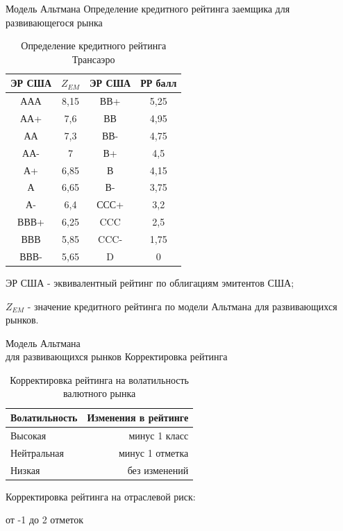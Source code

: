 \documentclass[_Banking_p2.tex]{subfiles}
\begin{document}
\begin{frame}[shrink=20]{Модель Альтмана}
{Определение кредитного рейтинга заемщика для развивающегося рынка}
\begin{table}[htbp]
\caption{Определение кредитного рейтинга Трансаэро}
\centering
\begin{tabular}{cccc}
\toprule
ЭР США & $Z_{EM}$ & ЭР США & РР балл \\
\midrule
ААА   & 8,15  & ВВ+   & 5,25 \\
АА+   & 7,6   & ВВ    & 4,95 \\
АА    & 7,3   & ВВ-   & 4,75 \\
АА-   & 7     & В+    & 4,5 \\
А+    & 6,85  & В     & 4,15 \\
А     & 6,65  & В-    & 3,75 \\
А-    & 6,4   & ССС+  & 3,2 \\
ВВВ+  & 6,25  & CCC   & 2,5 \\
ВВВ   & 5,85  & CCC-  & 1,75 \\
ВВВ-  & 5,65  & D     & 0 \\
\bottomrule
\end{tabular}%
\label{tab:addlabel}%
\end{table}%
ЭР США - эквивалентный рейтинг по облигациям эмитентов США;

$Z_{EM}$ - значение кредитного рейтинга по модели Альтмана для развивающихся рынков.
\end{frame}

\begin{frame}{Модель Альтмана\\ для развивающихся рынков}
{Корректировка рейтинга}
\begin{table}[htbp]
\centering
\caption{Корректировка рейтинга на волатильность валютного рынка}
\begin{tabular}{lr}
\toprule
Волатильность & Изменения в рейтинге \\
\midrule
Высокая & минус 1 класс \\
Нейтральная & минус 1 отметка \\
Низкая & без изменений \\
\bottomrule
\end{tabular}%
\label{tab:addlabel}%
\end{table}%

Корректировка рейтинга на отраслевой риск:

от -1 до 2 отметок

\end{frame}
\end{document}
